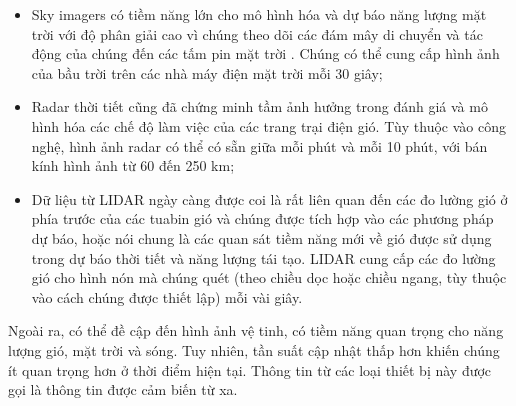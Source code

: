 \documentclass[utf8]{frontiersSCNS} %
\begin{document}
\begin{itemize}
\item Sky imagers có tiềm năng lớn cho mô hình hóa và dự báo năng lượng mặt trời với độ phân giải cao vì chúng theo dõi các đám mây di chuyển và tác động của chúng đến các tấm pin mặt trời \citep{Chow2011}. Chúng có thể cung cấp hình ảnh của bầu trời trên các nhà máy điện mặt trời mỗi 30 giây;

\item Radar thời tiết cũng đã chứng minh tầm ảnh hưởng trong đánh giá và mô hình hóa các chế độ làm việc của các trang trại điện gió. Tùy thuộc vào công nghệ, hình ảnh radar có thể có sẵn giữa mỗi phút và mỗi 10 phút, với bán kính hình ảnh từ 60 đến 250 km;

\item Dữ liệu từ LIDAR ngày càng được coi là rất liên quan đến các đo lường gió ở phía trước của các tuabin gió và chúng được tích hợp vào các phương pháp dự báo, hoặc nói chung là các quan sát tiềm năng mới về gió được sử dụng trong dự báo thời tiết và năng lượng tái tạo. LIDAR cung cấp các đo lường gió cho hình nón mà chúng quét (theo chiều dọc hoặc chiều ngang, tùy thuộc vào cách chúng được thiết lập) mỗi vài giây.
\end{itemize}

Ngoài ra, có thể đề cập đến hình ảnh vệ tinh, có tiềm năng quan trọng cho năng lượng gió, mặt trời và sóng. Tuy nhiên, tần suất cập nhật thấp hơn khiến chúng ít quan trọng hơn ở thời điểm hiện tại. Thông tin từ các loại thiết bị này được gọi là thông tin được cảm biến từ xa.


\end{document}
